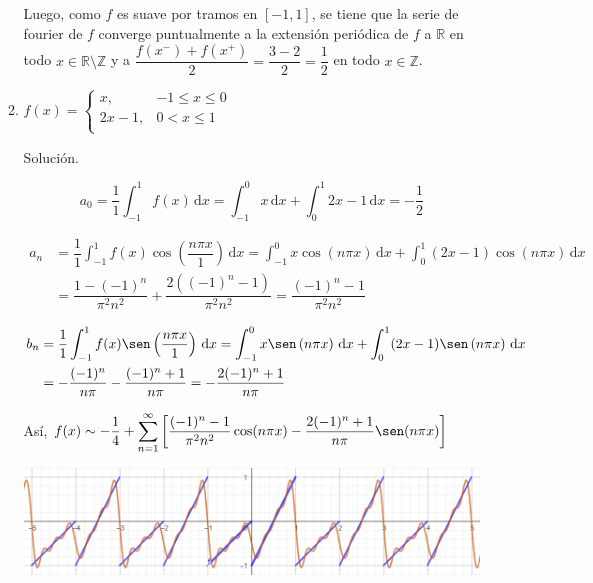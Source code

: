 \documentclass[fleqn]{article}
\newcommand{\real}{\mathbb{R}}
\newcommand{\ent}{\mathbb{Z}}
\newcommand{\intg}[3]{\int_{#1}^{#2} #3 \, \mathrm{d}x}
\begin{document}
\begin{enumerate}[I.]
\begin{enumerate}[(1)]
			Luego, como $f$ es suave por tramos en $ [-1,1] $, se tiene que la serie de fourier de $f$ converge puntualmente a la extensión periódica de $f$ a $ \real $ en todo $ x \in \real \setminus \ent $ y a $ \dfrac{f(x^-) + f(x^+)}{2} = \dfrac{3-2}{2} = \dfrac{1}{2} $ en todo $ x \in \ent $.


			\bfseries 
			\item $ f(x) = \begin{cases}
				x, & -1 \leq x \leq 0 \\
				2x - 1, & 0 < x \leq 1 \\
			\end{cases} $

			Solución.

			\normalfont

			\begin{equation*}
				a_0 = \dfrac{1}{1} \intg{-1}{1}{f(x)} = \intg{-1}{0}{x} + \intg{0}{1}{2x - 1} = -\dfrac{1}{2}
			\end{equation*}

			\begin{align*}
				a_n &= \dfrac{1}{1} \intg{-1}{1}{f(x) \cos \left( \dfrac{n \pi x}{1} \right)} = \intg{-1}{0}{x \cos \left(n \pi x \right)} + \intg{0}{1}{(2x - 1) \cos \left(n \pi x \right)} \\
				&= \dfrac{1 - (-1)^n}{\pi^2 n^2} + \dfrac{2((-1)^n - 1)}{\pi^2 n^2} = \dfrac{(-1)^n - 1}{\pi^2 n^2} 
			\end{align*}

			\begin{align*}
				b_n &= \dfrac{1}{1} \intg{-1}{1}{f(x) \sen \left( \dfrac{n \pi x}{1} \right)} = \intg{-1}{0}{x \sen \left(n \pi x \right)} + \intg{0}{1}{(2x - 1) \sen \left(n \pi x \right)} \\
				&= -\dfrac{(-1)^n}{n \pi} - \dfrac{(-1)^n + 1}{n \pi} = - \dfrac{2(-1)^n + 1}{n \pi}
			\end{align*}

			Así, $ \displaystyle f(x) \sim -\dfrac{1}{4} + \sum_{n=1}^{\infty} \left[ \dfrac{(-1)^n - 1}{\pi^2 n^2} \cos (n \pi x) - \dfrac{2(-1)^n + 1}{n \pi} \sen (n \pi x) \right] $

			\includegraphics[width=0.95\linewidth]{Ejer2.png}


\end{enumerate}
\end{enumerate}
\end{document}
